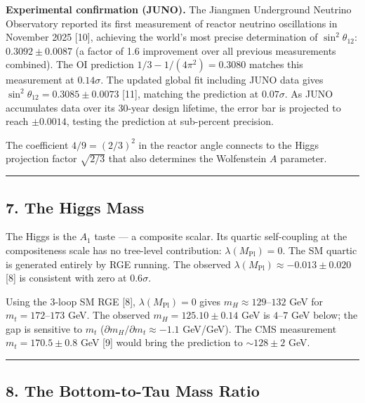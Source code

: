\documentclass[
  11pt,
]{article}
\begin{document}
\textbf{Experimental confirmation (JUNO).} The Jiangmen Underground
Neutrino Observatory reported its first measurement of reactor neutrino
oscillations in November 2025 {[}10{]}, achieving the world's most
precise determination of \(\sin^2\theta_{12}\): \(0.3092 \pm 0.0087\) (a
factor of 1.6 improvement over all previous measurements combined). The
OI prediction \(1/3 - 1/(4\pi^2) = 0.3080\) matches this measurement at
\(0.14\sigma\). The updated global fit including JUNO data gives
\(\sin^2\theta_{12} = 0.3085 \pm 0.0073\) {[}11{]}, matching the
prediction at \(0.07\sigma\). As JUNO accumulates data over its 30-year
design lifetime, the error bar is projected to reach \(\pm 0.0014\),
testing the prediction at sub-percent precision.

The coefficient \(4/9 = (2/3)^2\) in the reactor angle connects to the
Higgs projection factor \(\sqrt{2/3}\) that also determines the
Wolfenstein \(A\) parameter.

\begin{center}\rule{0.5\linewidth}{0.5pt}\end{center}

\hypertarget{the-higgs-mass}{%
\subsection{7. The Higgs Mass}\label{the-higgs-mass}}

The Higgs is the \(A_1\) taste --- a composite scalar. Its quartic
self-coupling at the compositeness scale has no tree-level contribution:
\(\lambda(M_{\text{Pl}}) = 0\). The SM quartic is generated entirely by
RGE running. The observed
\(\lambda(M_{\text{Pl}}) \approx -0.013 \pm 0.020\) {[}8{]} is
consistent with zero at \(0.6\sigma\).

Using the 3-loop SM RGE {[}8{]}, \(\lambda(M_{\text{Pl}}) = 0\) gives
\(m_H \approx 129\)--\(132\) GeV for \(m_t = 172\)--\(173\) GeV. The
observed \(m_H = 125.10 \pm 0.14\) GeV is \(4\)--\(7\) GeV below; the
gap is sensitive to \(m_t\) (\(\partial m_H/\partial m_t \approx -1.1\)
GeV/GeV). The CMS measurement \(m_t = 170.5 \pm 0.8\) GeV {[}9{]} would
bring the prediction to \(\sim 128 \pm 2\) GeV.

\begin{center}\rule{0.5\linewidth}{0.5pt}\end{center}

\hypertarget{the-bottom-to-tau-mass-ratio}{%
\subsection{8. The Bottom-to-Tau Mass
Ratio}\label{the-bottom-to-tau-mass-ratio}}
\end{document}
